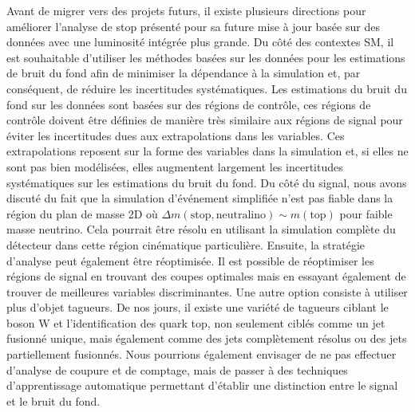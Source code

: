 Avant de migrer vers des projets futurs, il existe plusieurs directions pour améliorer l'analyse de stop présenté pour sa future mise à jour basée sur des données avec une luminosité intégrée plus grande. Du côté des contextes SM, il est souhaitable d'utiliser les méthodes basées sur les données pour les estimations de bruit du fond afin de minimiser la dépendance à la simulation et, par conséquent, de réduire les incertitudes systématiques. Les estimations du bruit du fond sur les données sont basées sur des régions de contrôle, ces régions de contrôle doivent être définies de manière très similaire aux régions de signal pour éviter les incertitudes dues aux extrapolations dans les variables. Ces extrapolations reposent sur la forme des variables dans la simulation et, si elles ne sont pas bien modélisées, elles augmentent largement les incertitudes systématiques sur les estimations du bruit du fond. Du côté du signal, nous avons discuté du fait que la simulation d'événement simplifiée n'est pas fiable dans la région du plan de masse 2D où $ \Delta m (\mathrm{stop, neutralino}) \sim m(\mathrm{top}) $ pour faible masse neutrino. Cela pourrait être résolu en utilisant la simulation complète du détecteur dans cette région cinématique particulière. Ensuite, la stratégie d'analyse peut également être réoptimisée. Il est possible de réoptimiser les régions de signal en trouvant des coupes optimales mais en essayant également de trouver de meilleures variables discriminantes. Une autre option consiste à utiliser plus  d'objet tagueurs. De nos jours, il existe une variété de tagueurs ciblant le boson W et l’identification des quark top, non seulement ciblés comme un jet fusionné unique, mais également comme des jets complètement résolus ou des jets partiellement fusionnés. Nous pourrions également envisager de ne pas effectuer d’analyse de coupure et de comptage, mais de passer à des techniques d’apprentissage automatique permettant d’établir une distinction entre le signal et le bruit du fond.


